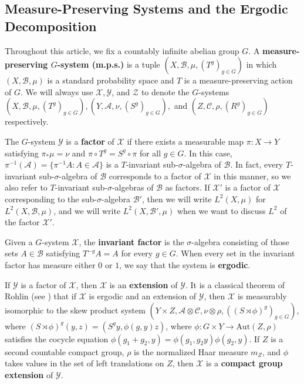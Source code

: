 \documentclass[graybox]{svmult}
\theoremstyle{definition}
\newcommand{\XX}{\mathcal{X}}
\renewcommand{\emph}[1]{\textbf{#1}}
\begin{document}
\subsection{Measure-Preserving Systems and the Ergodic Decomposition}\label{ssec:MPS&ErgodicDecomposition}
Throughout this article, we fix a countably infinite abelian group $G$.
A \textbf{measure-preserving $G$-system (m.p.s.)} is a tuple $(X,\mathscr{B},\mu,(T^g)_{g \in G})$ in which $(X,\mathscr{B},\mu)$ is a standard probability space and $T$ is a measure-preserving action of $G$.
We will always use $\mathcal{X}, \mathcal{Y}$, and $\mathcal{Z}$ to denote the $G$-systems $(X,\mathscr{B},\mu,(T^g)_{g \in G}), (Y,\mathscr{A},\nu,(S^g)_{g \in G}),$ and $(Z,\mathscr{C},\rho,(R^g)_{g \in G})$ respectively. 

The $G$-system $\mathcal{Y}$ is a \textbf{factor} of $\mathcal{X}$ if there exists a measurable map $\pi:X\rightarrow Y$ satisfying $\pi_*\mu = \nu$ and $\pi\circ T^g = S^g\circ\pi$ for all $g \in G$.
In this case, $\pi^{-1}(\mathscr{A})=\{\pi^{-1}A:A\in\mathscr{A}\}$ is a $T$-invariant sub-$\sigma$-algebra of $\mathscr{B}$.
In fact, every $T$-invariant sub-$\sigma$-algebra of $\mathscr{B}$ corresponds to a factor of $\mathcal{X}$ in this manner, so we also refer to $T$-invariant sub-$\sigma$-algebras of $\mathscr{B}$ as factors. 
If $\mathcal{X}'$ is a factor of $\mathcal{X}$ corresponding to the sub-$\sigma$-algebra $\mathscr{B}'$, then we will write $L^2(X,\mu)$ for $L^2(X,\mathscr{B},\mu)$, and we will write $L^2(X,\mathscr{B}',\mu)$ when we want to discuss $L^2$ of the factor $\mathcal{X}'$.

Given a $G$-system $\XX$, the \emph{invariant factor} is the $\sigma$-algebra consisting of those sets $A\in \mathscr{B}$ satisfying $T^{-g}A=A$ for every $g\in G$.
When every set in the invariant factor has measure either $0$ or $1$, we say that the system is \emph{ergodic}.

If $\mathcal{Y}$ is a factor of $\mathcal{X}$, then $\mathcal{X}$ is an \textbf{extension} of $\mathcal{Y}$. 
It is a classical theorem of Rohlin (see \cite[Theorem 3.18]{ErgodicTheoryViaJoinings}) that if $\mathcal{X}$ is ergodic and an extension of $\mathcal{Y}$, then $\mathcal{X}$ is %
measurably isomorphic to the skew product system $(Y\times Z,\mathscr{A}\otimes\mathscr{C},\nu\otimes\rho,((S\rtimes \phi)^g)_{g \in G})$, where $(S\rtimes \phi)^g(y,z) = (S^gy,\phi(g,y)z)$, where $\phi:G\times Y\rightarrow\text{Aut}(Z,\rho)$ satisfies the cocycle equation $\phi(g_1+g_2,y) = \phi(g_1,g_2y)\phi(g_2,y)$.
If $Z$ is a second countable compact group, $\rho$ is the normalized Haar measure $m_Z$, and $\phi$ takes values in the set of left translations on $Z$, then $\mathcal{X}$ is a \textbf{compact group extension} of $\mathcal{Y}$. 
\end{document}
